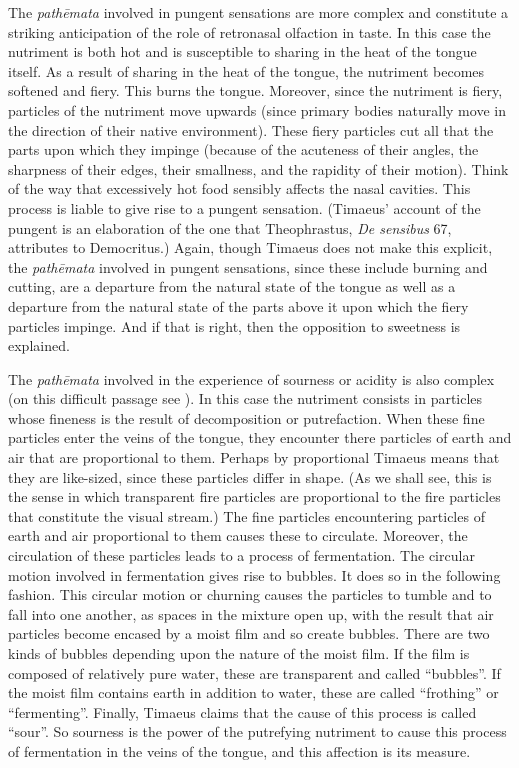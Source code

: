 The \emph{pathēmata} involved in pungent sensations are more complex and constitute a striking anticipation of the role of retronasal olfaction in taste. In this case the nutriment is both hot and is susceptible to sharing in the heat of the tongue itself. As a result of sharing in the heat of the tongue, the nutriment becomes softened and fiery. This burns the tongue. Moreover, since the nutriment is fiery, particles of the nutriment move upwards (since primary bodies naturally move in the direction of their native environment). These fiery particles cut all that the parts upon which they impinge (because of the acuteness of their angles, the sharpness of their edges, their smallness, and the rapidity of their motion). Think of the way that excessively hot food sensibly affects the nasal cavities. This process is liable to give rise to a pungent sensation. (Timaeus' account of the pungent is an elaboration of the one that Theophrastus, \emph{De sensibus} 67, attributes to Democritus.) Again, though Timaeus does not make this explicit, the \emph{pathēmata} involved in pungent sensations, since these include burning and cutting, are a departure from the natural state of the tongue as well as a departure from the natural state of the parts above it upon which the fiery particles impinge. And if that is right, then the opposition to sweetness is explained.

The \emph{pathēmata} involved in the experience of sourness or acidity is also complex (on this difficult passage see \citealt[chapter 6.4]{OBrien:1984ji}). In this case the nutriment consists in particles whose fineness is the result of decomposition or putrefaction. When these fine particles enter the veins of the tongue, they encounter there particles of earth and air that are proportional to them. Perhaps by proportional Timaeus means that they are like-sized, since these particles differ in shape. (As we shall see, this is the sense in which transparent fire particles are proportional to the fire particles that constitute the visual stream.) The fine particles encountering particles of earth and air proportional to them causes these to circulate. Moreover, the circulation of these particles leads to a process of fermentation. The circular motion involved in fermentation gives rise to bubbles. It does so in the following fashion. This circular motion or churning causes the particles to tumble and to fall into one another, as spaces in the mixture open up, with the result that air particles become encased by a moist film and so create bubbles. There are two kinds of bubbles depending upon the nature of the moist film. If the film is composed of relatively pure water, these are transparent and called ``bubbles''. If the moist film contains earth in addition to water, these are called ``frothing'' or ``fermenting''. Finally, Timaeus claims that the cause of this process is called ``sour''. So sourness is the power of the putrefying nutriment to cause this process of fermentation in the veins of the tongue, and this affection is its measure.

